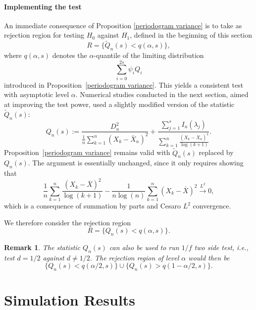 \documentclass[10pt,a4paper]{amsart}
\numberwithin{equation}{section}
\newtheorem{remark}{Remark}[section]
\begin{document}
\paragraph{Implementing the test} An immediate consequence of Proposition  \ref {periodogram variance} is to take as rejection region for testing $H_0$ against $H_1$, defined in the beginning of this section 
\[
R=\{\tilde Q_n(s)<q(\alpha,s)\},
\]
where $q(\alpha,s)$ denotes the $\alpha$-quantile of the limiting distribution
\[
\sum_{i=0}^{2s}\psi_i Q_i
\]
introduced in Proposition~\ref{periodogram variance}. This yields a consistent test with asymptotic level $\alpha$. Numerical studies conducted in the next section, aimed at improving the test power, used a slightly modified version 
 of the statistic $\tilde Q_n(s)$:
\[
Q_n(s):=\frac{D_n^2}{\frac{1}{n}{\displaystyle\sum_{k=1}^n(X_k-\bar X_n)^2}}
+\frac{\displaystyle\sum_{j=1}^s I_n(\lambda_j)}
{\displaystyle\sum_{k=1}^n\frac{(X_k-\bar X_n)^2}{\log(k+1)}}.
\]
Proposition~\ref{periodogram variance} remains valid with $\tilde Q_n(s)$ replaced by $Q_n(s)$. The argument is essentially unchanged, since it only requires showing that
\[
\frac{1}{n}\sum_{k=1}^n\frac{(X_k-\bar X)^2}{\log(k+1)}-
\frac{1}{n\log(n)}\sum_{k=1}^n (X_k-\bar X)^2\overset{L^2}{\longrightarrow}0,
\]
which is a consequence of summation by parts and Cesaro $L^2$ convergence. 


We therefore consider the rejection region 
\[
R=\{Q_n(s)<q(\alpha,s)\}.
\]
\begin{remark}
    The statistic $Q_n(s)$ can also be used to run $1/f$ two side test, i.e., test $d=1/2$ against $d\neq 1/2$. The rejection region of level $\alpha$ would then be 
    \[
\{Q_n(s)<q(\alpha/2,s)\}\cup\{Q_n(s)>q(1-\alpha/2,s)\}.
\]
\end{remark}
\section{Simulation Results}\label{robinson sim}
\end{document}
